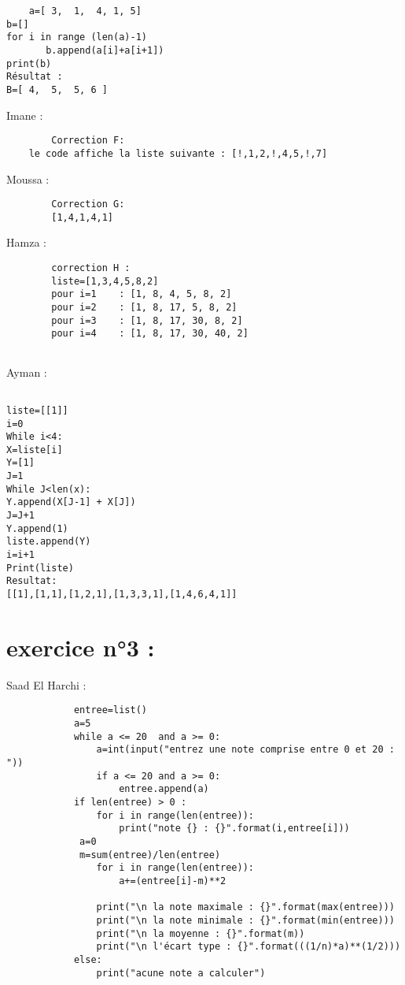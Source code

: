 \documentclass{article}
\begin{document}
	\begin{verbatim}
	a=[ 3,  1,  4, 1, 5]
b=[]
for i in range (len(a)-1)
       b.append(a[i]+a[i+1])
print(b)
Résultat :
B=[ 4,  5,  5, 6 ]
	\end{verbatim}

	\begin{center}
    		Imane :
        \end{center} 
	
	\begin{verbatim}
		Correction F:
	le code affiche la liste suivante : [!,1,2,!,4,5,!,7]

	\end{verbatim}
	
    	\begin{center}
    		Moussa :
	\end{center} 
	
	\begin{verbatim}
		Correction G:
		[1,4,1,4,1]
	\end{verbatim}

    	\begin{center}
    		Hamza :
	\end{center} 
	\begin{verbatim}
		correction H :
		liste=[1,3,4,5,8,2]
		pour i=1    : [1, 8, 4, 5, 8, 2]
		pour i=2    : [1, 8, 17, 5, 8, 2]
		pour i=3    : [1, 8, 17, 30, 8, 2]
		pour i=4    : [1, 8, 17, 30, 40, 2]
		
	\end{verbatim}

	\begin{center}
    		Ayman :
	\end{center} 
	\begin{verbatim}
	
liste=[[1]]
i=0
While i<4:
X=liste[i]
Y=[1]
J=1
While J<len(x):
Y.append(X[J-1] + X[J])
J=J+1
Y.append(1)
liste.append(Y)
i=i+1
Print(liste)
Resultat:
[[1],[1,1],[1,2,1],[1,3,3,1],[1,4,6,4,1]]
\end{verbatim}
\section{exercice n°3 :}
        \begin{center}
    		Saad El Harchi :
	\end{center}    	  
        	
    	\begin{verbatim}
			entree=list()
			a=5
			while a <= 20  and a >= 0:
    			a=int(input("entrez une note comprise entre 0 et 20 : "))
    			if a <= 20 and a >= 0:
        			entree.append(a) 
			if len(entree) > 0 :
    			for i in range(len(entree)):
        			print("note {} : {}".format(i,entree[i]))
   			 a=0
   			 m=sum(entree)/len(entree)
    			for i in range(len(entree)):
        			a+=(entree[i]-m)**2
    
    			print("\n la note maximale : {}".format(max(entree)))
    			print("\n la note minimale : {}".format(min(entree)))
    			print("\n la moyenne : {}".format(m))
    			print("\n l'écart type : {}".format(((1/n)*a)**(1/2)))
			else:
    			print("acune note a calculer")
		\end{verbatim}
\end{document}
